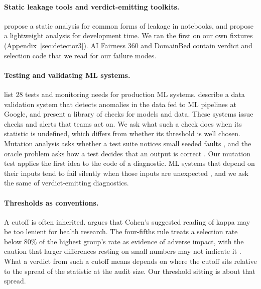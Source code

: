 \documentclass[10pt]{article}
\theoremstyle{definition}
\begin{document}
\paragraph{Static leakage tools and verdict-emitting toolkits.} \citet{yang2022leakage} propose a static analysis for common forms of leakage in notebooks, and \citet{subotic2022leakage} propose a lightweight analysis for development time. We ran the first on our own fixtures (Appendix~\ref{sec:detector3}). AI Fairness 360 \citep{bellamy2019aif360} and DomainBed \citep{gulrajani2021search} contain verdict and selection code that we read for our failure modes.

\paragraph{Testing and validating ML systems.} \citet{breck2017mltest} list 28 tests and monitoring needs for production ML systems. \citet{breck2019datavalidation} describe a data validation system that detects anomalies in the data fed to ML pipelines at Google, and \citet{chorev2022deepchecks} present a library of checks for models and data. These systems issue checks and alerts that teams act on. We ask what such a check does when its statistic is undefined, which differs from whether its threshold is well chosen. Mutation analysis asks whether a test suite notices small seeded faults \citep{jia2011mutation}, and the oracle problem asks how a test decides that an output is correct \citep{barr2015oracle}. Our mutation test applies the first idea to the code of a diagnostic. ML systems that depend on their inputs tend to fail silently when those inputs are unexpected \citep{rabanser2019failing}, and we ask the same of verdict-emitting diagnostics.

\paragraph{Thresholds as conventions.} A cutoff is often inherited. \citet{mchugh2012kappa} argues that Cohen's suggested reading of kappa may be too lenient for health research. The four-fifths rule treats a selection rate below 80\% of the highest group's rate as evidence of adverse impact, with the caution that larger differences resting on small numbers may not indicate it \citep{cfr1607}. What a verdict from such a cutoff means depends on where the cutoff sits relative to the spread of the statistic at the audit size. Our threshold sitting is about that spread.
\end{document}
